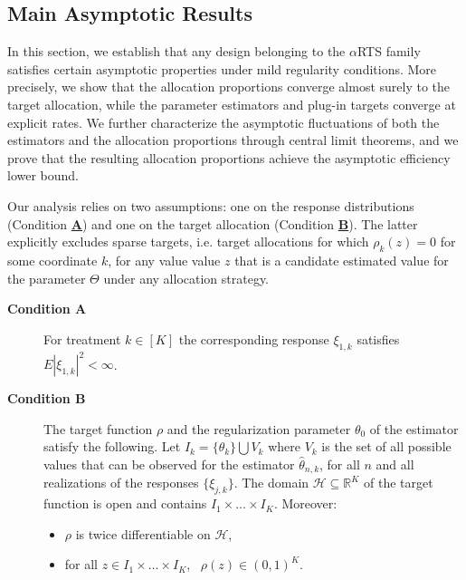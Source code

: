 \subsection{Main Asymptotic Results}

In this section, we establish that any design belonging to the $\alpha$RTS family satisfies certain asymptotic properties under mild regularity conditions. More precisely, we show that the allocation proportions converge almost surely to the target allocation, while the parameter estimators and plug-in targets converge at explicit rates. We further characterize the asymptotic fluctuations of both the estimators and the allocation proportions through central limit theorems, and we prove that the resulting allocation proportions achieve the asymptotic efficiency lower bound.

Our analysis relies on two assumptions: one on the response distributions (Condition \hyperlink{CA}{\textbf{A}}) and one on the target allocation (Condition \hyperlink{CB}{\textbf{B}}). The latter explicitly excludes sparse targets, i.e. target allocations for which $\rho_k(z)=0$ for some coordinate $k$, for any value value $z$ that is a candidate estimated value for the parameter $\Theta$ under any allocation strategy.

\begin{description}
	\item[\hypertarget{CA}{\textbf{Condition A}}] For treatment \(k \in [K]\) the corresponding response \(\xi_{1,k}\) satisfies  $
	E|\xi_{1,k}|^{2} < \infty $. \\
	
	\item[\hypertarget{CB}{\textbf{Condition B}}] The target function $\rho$ and the regularization parameter $\theta_0$ of the estimator satisfy the following. Let $I_k = \{\theta_k\} \bigcup V_k$ where $V_k$ is the set of all possible values that can be observed for the estimator $\hat\theta_{n,k}$, for all $n$ and all realizations of the responses $\{\xi_{j,k}\}$. The domain $\mathcal{H} \subseteq \mathbb{R}^K$ of the target function is open and contains $I_1\times \dots \times I_K$. Moreover:
	\begin{itemize}
		\item \(\rho\) is twice differentiable on $\mathcal{H}$,
		\item for all $z \in I_1\times \dots \times I_K$, \ \(\rho(z) \in (0,1)^K\).
	\end{itemize}
\end{description}


